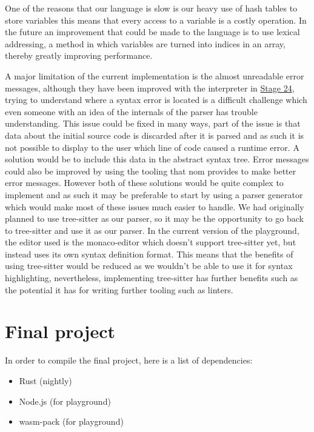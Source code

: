\documentclass{article}
\begin{document}
One of the reasons that our language is slow is our heavy use of hash tables to
store variables this means that every access to a variable is a costly
operation. In the future an improvement that could be made to the language is
to use lexical addressing, a method in which variables are turned into indices
in an array, thereby greatly improving performance.

A major limitation of the current implementation is the almost unreadable error
messages, although they have been improved with the interpreter in
\hyperref[sec:better_errors]{Stage 24}, trying to understand where a syntax
error is located is a difficult challenge which even someone with an idea of the
internals of the parser has trouble understanding.  This issue could be fixed in
many ways, part of the issue is that data about the initial source code is
discarded after it is parsed and as such it is not possible to display to the
user which line of code caused a runtime error. A solution would be to include
this data in the abstract syntax tree. Error messages could also be improved by
using the tooling that nom provides to make better error messages. However both
of these solutions would be quite complex to implement and as such it may be
preferable to start by using a parser generator which would make most of these
issues much easier to handle. We had originally planned to use tree-sitter as
our parser, so it may be the opportunity to go back to tree-sitter and use it as
our parser. In the current version of the playground, the editor used is the
monaco-editor which doesn't support tree-sitter yet, but instead uses its own
syntax definition format. This means that the benefits of using tree-sitter
would be reduced as we wouldn't be able to use it for syntax highlighting,
nevertheless, implementing tree-sitter has further benefits such as the
potential it has for writing further tooling such as linters.

\section{Final project}
\label{sec:final_project}

In order to compile the final project, here is a list of dependencies:

\begin{itemize}
	\item Rust (nightly)
	\item Node.js (for playground)
	\item wasm-pack (for playground)
\end{itemize}
\end{document}
